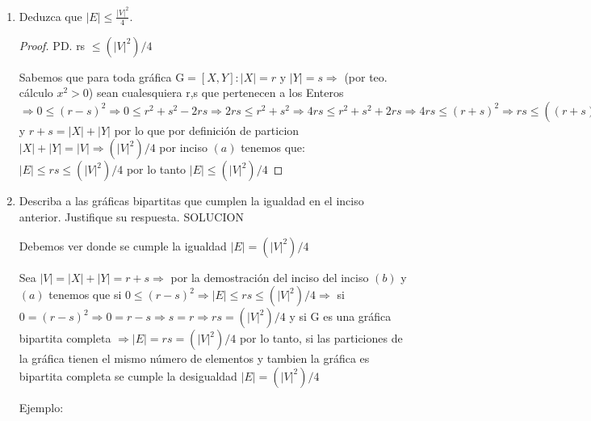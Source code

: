 \documentclass{article}
\begin{document}
\begin{enumerate}
\begin{enumerate}
\begin{proof}
  Por lo tanto, para toda G(V,E) si G[X,Y]: $|X|=r$ y $|Y|=s \Longrightarrow$ MAX$\{|E|\} =$ rs
  \end{proof}
  \item Deduzca que $|E| \le \frac{|V|^2}{4}$.
\begin{proof}
  PD. rs $ \leqslant (|V|^2)/4$
  
  Sabemos que para toda gráfica G$=[X,Y]: |X|=r$ y $|Y|=s \Longrightarrow$ (por teo. cálculo $x^2 > 0$) sean cualesquiera r,s que pertenecen a los Enteros  $\Longrightarrow  0 \leqslant (r-s)^2  \Longrightarrow 0   \leqslant r^2 + s^2 -2rs \Longrightarrow 2rs \leqslant r^2 + s^2 \Longrightarrow 4rs \leqslant r^2 + s^2 + 2rs \Longrightarrow 4rs \leqslant (r+s)^2 \Longrightarrow rs \leqslant ((r+s)^2)/4 $ y $r+s = |X|+|Y|$ por lo que por definición de particion $|X| + |Y| = |V|  \Longrightarrow (|V|^2)/4$ por inciso $(a)$ tenemos que:  $|E|\leqslant rs \leqslant (|V|^2)/4$
   por lo tanto $ |E|\leqslant (|V|^2)/4 $ 
  
  \end{proof}

  \item Describa a las gr\'aficas bipartitas que cumplen la igualdad en el
    inciso anterior. Justifique su respuesta.
SOLUCION

Debemos ver donde se cumple la igualdad $|E|= (|V|^2)/4$

Sea $|V|= |X| + |Y| = r+s \Longrightarrow$ por la demostración del inciso del inciso $(b)$ y $(a)$ tenemos que si $0\leqslant(r-s)^2 \Longrightarrow |E|\leqslant rs \leqslant (|V|^2)/4 \Longrightarrow$ si $0=(r-s)^2 \Longrightarrow 0=r-s \Longrightarrow s=r \Longrightarrow rs=(|V|^2)/4 $ y si G es una gráfica bipartita completa $\Longrightarrow |E|=rs=(|V|^2)/4$ por lo tanto, si las particiones de la gráfica tienen el mismo número de elementos y tambien la gráfica es bipartita completa se cumple la desigualdad $|E|= (|V|^2)/4$


Ejemplo:
\begin{figure}[ht!]                                                             
  \centering
\end{figure}
\end{enumerate}
\end{enumerate}
\end{document}
